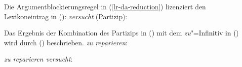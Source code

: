 {\noindent
Die Argumentblockierungsregel in (\ref{lr-da-reduction}) lizenziert den Lexikoneintrag in ():
\eas
\label{le-versucht-hm}
\emph{versucht} (Partizip):\\
\zs

\noindent
Das Ergebnis der Kombination des Partizips in () mit dem \emph{zu}"=Infinitiv in
() wird durch () beschrieben.
\eas
\emph{zu reparieren}:\\
\zs

\eas
\label{ex-zu-reparieren-versucht}
\emph{zu reparieren versucht}:\\
\zs

}
